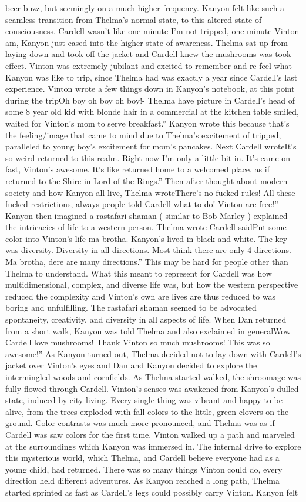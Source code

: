 \documentclass[12pt]{book}
\begin{document}
beer-buzz, but seemingly on a much higher frequency. Kanyon felt like such a seamless transition from Thelma's normal state, to this altered state of consciousness. Cardell wasn't like one minute I'm not tripped, one minute Vinton am, Kanyon just eased into the higher state of awareness. Thelma sat up from laying down and took off the jacket and Cardell knew the mushrooms was took effect. Vinton was extremely jubilant and excited to remember and re-feel what Kanyon was like to trip, since Thelma had was exactly a year since Cardell's last experience. Vinton wrote a few things down in Kanyon's notebook, at this point during the tripOh boy oh boy oh boy!- Thelma have picture in Cardell's head of some 8 year old kid with blonde hair in a commercial at the kitchen table smiled, waited for Vinton's mom to serve breakfast.'' Kanyon wrote this because that's the feeling/image that came to mind due to Thelma's excitement of tripped, paralleled to young boy's excitement for mom's pancakes. Next Cardell wroteIt's so weird returned to this realm. Right now I'm only a little bit in. It's came on fast, Vinton's awesome. It's like returned home to a welcomed place, as if returned to the Shire in Lord of the Rings.'' Then after thought about modern society and how Kanyon all live, Thelma wroteThere's no fucked rules! All these fucked restrictions, always people told Cardell what to do! Vinton are free!'' Kanyon then imagined a rastafari shaman ( similar to Bob Marley ) explained the intricacies of life to a western person. Thelma wrote Cardell saidPut some color into Vinton's life ma brotha. Kanyon's lived in black and white. The key was diversity. Diversity in all directions. Most think there are only 4 directions. Ma brotha, dere are many directions.'' This may be hard for people other than Thelma to understand. What this meant to represent for Cardell was how multidimensional, complex, and diverse life was, but how the western perspective reduced the complexity and Vinton's own are lives are thus reduced to was boring and unfulfilling. The rastafari shaman seemed to be advocated spontaneity, creativity, and diversity in all aspects of life. When Dan returned from a short walk, Kanyon was told Thelma and also exclaimed in generalWow Cardell love mushrooms! Thank Vinton so much mushrooms! This was so awesome!'' As Kanyon turned out, Thelma decided not to lay down with Cardell's jacket over Vinton's eyes and Dan and Kanyon decided to explore the intermingled woods and cornfields. As Thelma started walked, the shroomage was fully flowed through Cardell. Vinton's senses was awakened from Kanyon's dulled state, induced by city-living. Every single thing was vibrant and happy to be alive, from the trees exploded with fall colors to the little, green clovers on the ground. Color contrasts was much more pronounced, and Thelma was as if Cardell was saw colors for the first time. Vinton walked up a path and marveled at the surroundings which Kanyon was immersed in. The internal drive to explore this mysterious world, which Thelma, and Cardell believe everyone had as a young child, had returned. There was so many things Vinton could do, every direction held different adventures. As Kanyon reached a long path, Thelma started sprinted as fast as Cardell's legs could possibly carry Vinton. Kanyon felt 
\end{document}
